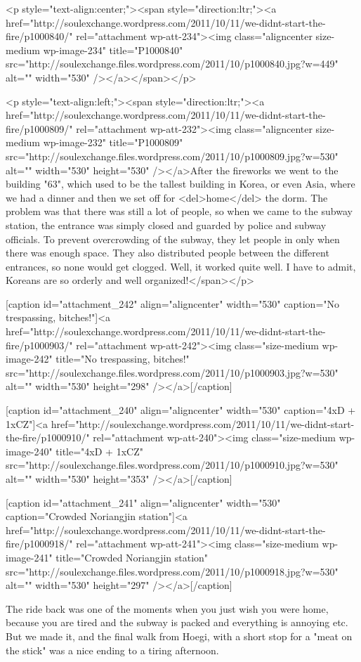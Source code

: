 \begin{post}
\begin{content}
<p style="text-align:center;"><span style="direction:ltr;"><a href="http://soulexchange.wordpress.com/2011/10/11/we-didnt-start-the-fire/p1000840/" rel="attachment wp-att-234"><img class="aligncenter size-medium wp-image-234" title="P1000840" src="http://soulexchange.files.wordpress.com/2011/10/p1000840.jpg?w=449" alt="" width="530" /></a></span></p>

<p style="text-align:left;"><span style="direction:ltr;"><a href="http://soulexchange.wordpress.com/2011/10/11/we-didnt-start-the-fire/p1000809/" rel="attachment wp-att-232"><img class="aligncenter size-medium wp-image-232" title="P1000809" src="http://soulexchange.files.wordpress.com/2011/10/p1000809.jpg?w=530" alt="" width="530" height="530" /></a>After the fireworks we went to the building "63", which used to be the tallest building in Korea, or even Asia, where we had a dinner and then we set off for <del>home</del> the dorm. The problem was that there was still a lot of people, so when we came to the subway station, the entrance was simply closed and guarded by police and subway officials. To prevent overcrowding of the subway, they let people in only when there was enough space. They also distributed people between the different entrances, so none would get clogged. Well, it worked quite well. I have to admit, Koreans are so orderly and well organized!</span></p>





[caption id="attachment_242" align="aligncenter" width="530" caption="No trespassing, bitches!"]<a href="http://soulexchange.wordpress.com/2011/10/11/we-didnt-start-the-fire/p1000903/" rel="attachment wp-att-242"><img class="size-medium wp-image-242" title="No trespassing, bitches!" src="http://soulexchange.files.wordpress.com/2011/10/p1000903.jpg?w=530" alt="" width="530" height="298" /></a>[/caption]



[caption id="attachment_240" align="aligncenter" width="530" caption="4xD + 1xCZ"]<a href="http://soulexchange.wordpress.com/2011/10/11/we-didnt-start-the-fire/p1000910/" rel="attachment wp-att-240"><img class="size-medium wp-image-240" title="4xD + 1xCZ" src="http://soulexchange.files.wordpress.com/2011/10/p1000910.jpg?w=530" alt="" width="530" height="353" /></a>[/caption]



[caption id="attachment_241" align="aligncenter" width="530" caption="Crowded Noriangjin station"]<a href="http://soulexchange.wordpress.com/2011/10/11/we-didnt-start-the-fire/p1000918/" rel="attachment wp-att-241"><img class="size-medium wp-image-241" title="Crowded Noriangjin station" src="http://soulexchange.files.wordpress.com/2011/10/p1000918.jpg?w=530" alt="" width="530" height="297" /></a>[/caption]



The ride back was one of the moments when you just wish you were home, because you are tired and the subway is packed and everything is annoying etc. But we made it, and the final walk from Hoegi, with a short stop for a "meat on the stick" was a nice ending to a tiring afternoon.
	\end{content}
\end{post}
